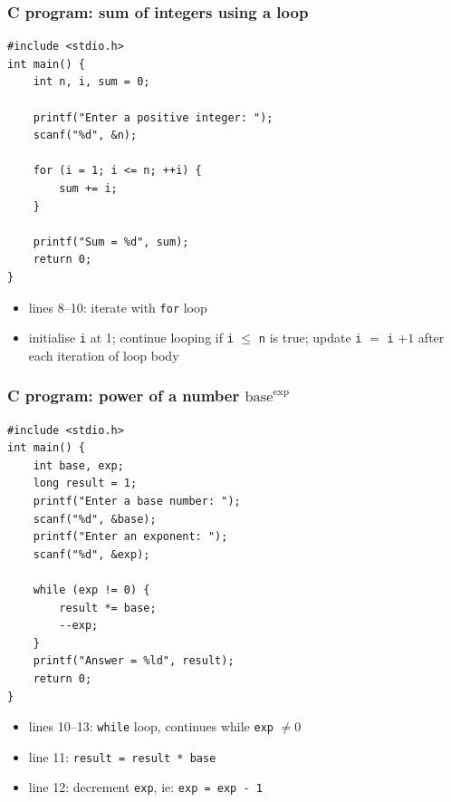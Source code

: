 \documentclass[english,14pt]{beamer}
\begin{document}

\begin{frame}[fragile]


\frametitle{C program: sum of integers using a loop}
\vspace*{-3mm}
\begin{lstlisting}[style=CStyle,basicstyle=\footnotesize]
#include <stdio.h>
int main() {
    int n, i, sum = 0;

    printf("Enter a positive integer: ");
    scanf("%d", &n);

    for (i = 1; i <= n; ++i) {
        sum += i;
    }

    printf("Sum = %d", sum);
    return 0;
}
\end{lstlisting}
\vspace*{-3mm}
\begin{itemize}
	\item lines 8--10: iterate with \texttt{for} loop
	\item[] initialise \texttt{i} at 1; continue looping if \texttt{i} $\leq$ \texttt{n} is true; update \texttt{i} $=$ \texttt{i} $ + 1$ after each iteration of loop body
\end{itemize}

\end{frame}


\begin{frame}[fragile]


\frametitle{C program: power of a number $\mathrm{base}^\mathrm{exp}$}
\vspace*{-3mm}
\begin{lstlisting}[style=CStyle,basicstyle=\scriptsize]
#include <stdio.h>
int main() {
    int base, exp;
    long result = 1;
    printf("Enter a base number: ");
    scanf("%d", &base);
    printf("Enter an exponent: ");
    scanf("%d", &exp);

    while (exp != 0) {
        result *= base;
        --exp;
    }
    printf("Answer = %ld", result);
    return 0;
}
\end{lstlisting}
\vspace*{-3mm}
\begin{itemize}
	\item lines 10--13: \texttt{while} loop, continues while \texttt{exp} $\neq 0$
	\item line 11: \texttt{result = result * base}
	\item line 12: decrement \texttt{exp}, ie: \texttt{exp = exp - 1}
\end{itemize}

\end{frame}
\end{document}
